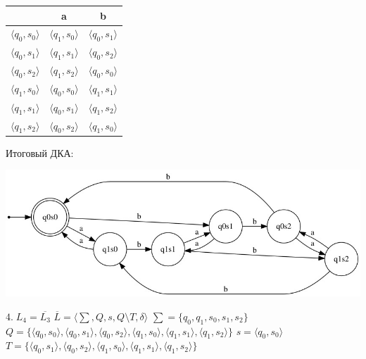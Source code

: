 \documentclass[a4paper,12pt]{article}
\begin{document}
\begin{center}
\begin{tabular}{ |c|c|c| } 
\hline
  & a & b \\ [0.5ex] 
 \hline
 $\langle q_0 , s_0 \rangle $ & $\langle q_1 , s_0 \rangle$ & $\langle q_0 , s_1 \rangle$ \\ 
 $\langle q_0 , s_1 \rangle $ & $\langle q_1 , s_1 \rangle$ & $\langle q_0 , s_2 \rangle$ \\ 
 $\langle q_0 , s_2 \rangle $ & $\langle q_1 , s_2 \rangle$ & $\langle q_0 , s_0 \rangle$ \\ 
 $\langle q_1 , s_0 \rangle $ & $\langle q_0 , s_0 \rangle$ & $\langle q_1 , s_1 \rangle$ \\ 
 $\langle q_1 , s_1 \rangle $ & $\langle q_0 , s_1 \rangle$ & $\langle q_1 , s_2 \rangle$ \\
 $\langle q_1 , s_2 \rangle $ & $\langle q_0 , s_2 \rangle$ & $\langle q_1 , s_0 \rangle$ \\
 \hline
\end{tabular}
\end{center}
Итоговый ДКА:
\begin{center}
\includegraphics[width=1.15\textwidth]{2_3}\newline
\end{center}
\Large $4.\;L_4 = \overline{L_3}$\newline
$\overline{L} = {\langle\sum , Q, s, Q\setminus T, \delta \rangle}$\newline
$\sum = \{q_0, q_1, s_0, s_1, s_2\}$\newline
\normalsize $Q = \{\langle q_0 , s_0 \rangle ,\langle q_0 , s_1 \rangle ,\langle q_0 , s_2 \rangle , \langle q_1 , s_0 \rangle , \langle q_1 , s_1 \rangle , \langle q_1 , s_2 \rangle \}$\newline
\Large $s = \langle q_0 , s_0 \rangle$\newline
$T = \{\langle q_0 , s_1 \rangle ,\langle q_0 , s_2 \rangle , \langle q_1 , s_0 \rangle , \langle q_1 , s_1 \rangle , \langle q_1 , s_2 \rangle \}$\newline
\end{document}
